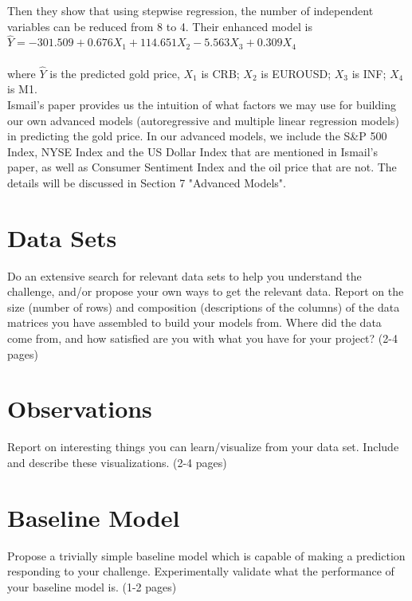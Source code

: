 \documentclass[runningheads]{llncs}
\begin{document}
Then they show that using stepwise regression, the number of independent variables can be reduced from 8 to 4. Their enhanced model is  \\

$\hat{Y}=-301.509+0.676X_1+114.651X_2-5.563X_3+0.309X_4$ \\\\
where $\hat{Y}$ is the predicted gold price, $X_1$ is CRB; $X_2$ is EUROUSD; $X_3$ is INF; $X_4$ is M1. \\

Ismail's paper provides us the intuition of what factors we may use for building our own advanced models (autoregressive and multiple linear regression models) in predicting the gold price. In our advanced models, we include the S\&P 500 Index, NYSE Index and the US Dollar Index that are mentioned in Ismail's paper, as well as Consumer Sentiment Index and the oil price that are not. The details will be discussed in Section 7 "Advanced Models".


\section{Data Sets}

Do an extensive search for relevant data sets to help you understand the challenge, and/or propose your own ways to get the relevant data. Report on the size (number of rows) and composition (descriptions of the columns) of the data matrices you have assembled to build your models from.  Where did the data come from, and how satisfied are you with what you have for your project? (2-4 pages)



\section{Observations}

Report on interesting things you can learn/visualize from your data set.  Include and describe these visualizations.  (2-4 pages)


\section{Baseline Model}

Propose a trivially simple baseline model which is capable of making a prediction responding to your challenge.   Experimentally validate what the performance of your baseline model is.   (1-2 pages)
\end{document}
